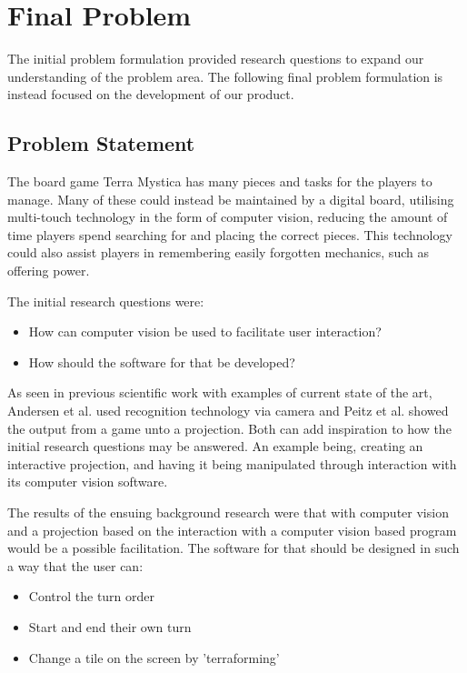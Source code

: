 \chapter{Final Problem}\label{ch:finprob}
The initial problem formulation provided research questions to expand our understanding of the problem area. The following final problem formulation is instead focused on the development of our product.

\section{Problem Statement}\label{sec:ProblemStatement}
The board game Terra Mystica has many pieces and tasks for the players to manage. Many of these could instead be maintained by a digital board, utilising multi-touch technology in the form of computer vision, reducing the amount of time players spend searching for and placing the correct pieces. This technology could also assist players in remembering easily forgotten mechanics, such as offering power.

The initial research questions were:
\begin{itemize}
	\item How can computer vision be used to facilitate user interaction?
	\item How should the software for that be developed?
\end{itemize}

As seen in previous scientific work with examples of current state of the art, Andersen et al. \citep{andersen_designing_2004} used recognition technology via camera and Peitz et al. \citep{peitzWizards2006} showed the output from a game unto a projection. Both can add inspiration to how the initial research questions may be answered. An example being, creating an interactive projection, and having it being manipulated through interaction with its computer vision software.

The results of the ensuing background research were that with computer vision and a projection based on the interaction with a computer vision based program would be a possible facilitation.
The software for that should be designed in such a way that the user can:
\begin{itemize}
\item Control the turn order
\item Start and end their own turn
\item Change a tile on the screen by 'terraforming'
\end{itemize}

